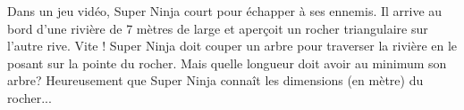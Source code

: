\documentclass[11pt,a4paper]{article}  %
\begin{document}
\begin{enumMet}
\end{enumMet}


Dans un jeu vidéo, Super Ninja court pour échapper à ses ennemis. Il arrive au bord d'une rivière de 7 mètres de large et aperçoit un rocher triangulaire sur l'autre rive. Vite ! Super Ninja doit couper un arbre pour traverser la rivière en le posant sur la pointe du rocher. Mais quelle longueur doit avoir au minimum son arbre? Heureusement que Super Ninja connaît les dimensions (en mètre) du rocher...
\end{document}
